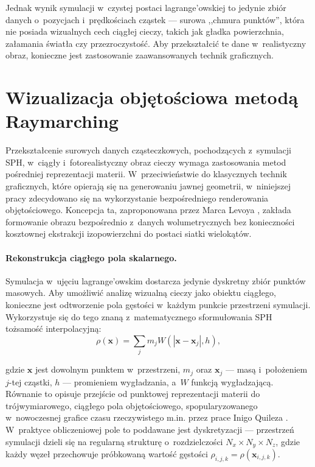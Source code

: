 Jednak wynik symulacji w~czystej postaci lagrange’owskiej to jedynie zbiór danych o~pozycjach i~prędkościach cząstek --- surowa ,,chmura punktów'', która nie posiada wizualnych cech ciągłej cieczy, takich jak gładka powierzchnia, załamania światła czy przezroczystość. Aby przekształcić te dane w~realistyczny obraz, konieczne jest zastosowanie zaawansowanych technik graficznych.

\section{Wizualizacja objętościowa metodą Raymarching}
Przekształcenie surowych danych cząsteczkowych, pochodzących z~symulacji SPH, w~ciągły i~fotorealistyczny obraz cieczy wymaga zastosowania metod pośredniej reprezentacji materii. W~przeciwieństwie do klasycznych technik graficznych, które opierają się na generowaniu jawnej geometrii, w~niniejszej pracy zdecydowano się na wykorzystanie bezpośredniego renderowania objętościowego. Koncepcja ta, zaproponowana przez Marca Levoya \cite{levoy1988volume}, zakłada formowanie obrazu bezpośrednio z~danych wolumetrycznych bez konieczności kosztownej ekstrakcji izopowierzchni do postaci siatki wielokątów.

\paragraph{Rekonstrukcja ciągłego pola skalarnego.}
Symulacja w~ujęciu lagrange’owskim dostarcza jedynie dyskretny zbiór punktów masowych. Aby umożliwić analizę wizualną cieczy jako obiektu ciągłego, konieczne jest odtworzenie pola gęstości w~każdym punkcie przestrzeni symulacji. Wykorzystuje się do tego znaną z~matematycznego sformułowania SPH tożsamość interpolacyjną:
    \begin{equation}
        \rho(\mathbf{x}) = \sum_{j} m_j W(|\mathbf{x} - \mathbf{x}_j|, h),
    \end{equation}

    gdzie $\mathbf{x}$ jest dowolnym punktem w~przestrzeni, $m_j$ oraz $\mathbf{x}_j$ --- masą i~położeniem $j$-tej cząstki, $h$ --- promieniem wygładzania, a~$W$ funkcją wygładzającą. Równanie to opisuje przejście od punktowej reprezentacji materii do trójwymiarowego, ciągłego pola objętościowego, spopularyzowanego w~nowoczesnej grafice czasu rzeczywistego m.in. przez prace Inigo Quileza \cite{quilez2008raymarching}. W~praktyce obliczeniowej pole to poddawane jest dyskretyzacji --- przestrzeń symulacji dzieli się na regularną strukturę o~rozdzielczości $N_x \times N_y \times N_z$, gdzie każdy węzeł przechowuje próbkowaną wartość gęstości $\rho_{i,j,k} = \rho(\mathbf{x}_{i,j,k})$.
    

